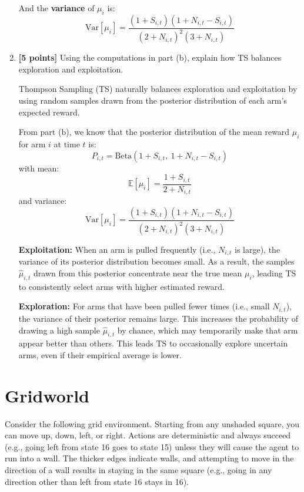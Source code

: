\documentclass[a3paper,12pt]{extarticle} %
\begin{document}
\begin{enumerate}
And the \textbf{variance} of $\mu_i$ is:
\[
\text{Var}[\mu_i] = \frac{(1 + S_{i,t})(1 + N_{i,t} - S_{i,t})}{(2 + N_{i,t})^2 (3 + N_{i,t})}
\]


    \item \textbf{[5 points]} Using the computations in part (b), explain how TS balances exploration and exploitation.

Thompson Sampling (TS) naturally balances exploration and exploitation by using random samples drawn from the posterior distribution of each arm's expected reward.

From part (b), we know that the posterior distribution of the mean reward $\mu_i$ for arm $i$ at time $t$ is:
\[
P_{i,t} = \text{Beta}(1 + S_{i,t},\ 1 + N_{i,t} - S_{i,t})
\]
with mean:
\[
\mathbb{E}[\mu_i] = \frac{1 + S_{i,t}}{2 + N_{i,t}}
\]
and variance:
\[
\text{Var}[\mu_i] = \frac{(1 + S_{i,t})(1 + N_{i,t} - S_{i,t})}{(2 + N_{i,t})^2 (3 + N_{i,t})}
\]

\textbf{Exploitation:} When an arm is pulled frequently (i.e., $N_{i,t}$ is large), the variance of its posterior distribution becomes small. As a result, the samples $\hat{\mu}_{i,t}$ drawn from this posterior concentrate near the true mean $\mu_i$, leading TS to consistently select arms with higher estimated reward.

\textbf{Exploration:} For arms that have been pulled fewer times (i.e., small $N_{i,t}$), the variance of their posterior remains large. This increases the probability of drawing a high sample $\hat{\mu}_{i,t}$ by chance, which may temporarily make that arm appear better than others. This leads TS to occasionally explore uncertain arms, even if their empirical average is lower.



\end{enumerate}

\newpage
\section{Gridworld}
Consider the following grid environment. Starting from any unshaded square, you can move up, down, left, or right. Actions are deterministic and always succeed (e.g., going left from state 16 goes to state 15) unless they will cause the agent to run into a wall. The thicker edges indicate walls, and attempting to move in the direction of a wall results in staying in the same square (e.g., going in any direction other than left from state 16 stays in 16).
\end{document}
